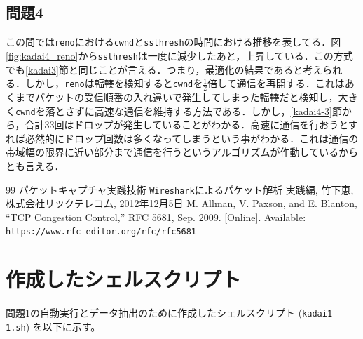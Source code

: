 \documentclass[paper=a4, fontsize=10pt]{jlreq}
\begin{document}
\subsection*{問題4}

この問では\texttt{reno}における\texttt{cwnd}と\texttt{ssthresh}の時間における推移を表してる．図\ref{fig:kadai4_reno}から\texttt{ssthresh}は一度に減少したあと，上昇している．この方式でも\ref{kadai3}節と同じことが言える．つまり，最適化の結果であると考えられる．しかし，\texttt{reno}は輻輳を検知すると\texttt{cwnd}を$\frac{1}{2}$倍して通信を再開する．これはあくまでパケットの受信順番の入れ違いで発生してしまった輻輳だと検知し，大きく\texttt{cwnd}を落とさずに高速な通信を維持する方法である\cite{rfc5681}．しかし，\ref{kadai4-3}節から，合計$33$回はドロップが発生していることがわかる．高速に通信を行おうとすれば必然的にドロップ回数は多くなってしまうという事がわかる．これは通信の帯域幅の限界に近い部分まで通信を行うというアルゴリズムが作動しているからとも言える．

\begin{thebibliography}{99}
   パケットキャプチャ実践技術 \texttt{Wireshark}によるパケット解析 実践編, 竹下恵, 株式会社リックテレコム, 2012年12月5日
M. Allman, V. Paxson, and E. Blanton,
``{TCP} Congestion Control,''
RFC 5681, Sep. 2009.
[Online]. Available: \texttt{https://www.rfc-editor.org/rfc/rfc5681}
\end{thebibliography}


\section{作成したシェルスクリプト}
問題1の自動実行とデータ抽出のために作成したシェルスクリプト (\texttt{kadai1-1.sh}) を以下に示す。














\end{document}
